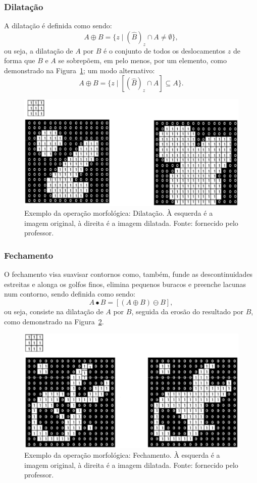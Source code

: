 \documentclass[conference]{Trabalho_2}
\begin{document}
\subsubsection{Dilata\c{c}\~ao}
A dilata\c{c}\~ao \'e definida como sendo:
$$ A \oplus B  = \{z \mid (\hat{B})_z \cap A \neq \emptyset \},$$
ou seja, a dilata\c{c}\~ao de $A$ por $B$ \'e o conjunto de todos os deslocamentos $z$ de forma que $B$ e $A$ se sobrep\~oem, em pelo menos, por um elemento, como demonstrado na Figura~\ref{fig:dilata}; um modo alternativo:
$$ A \oplus B  = \{z \mid [(\hat{B})_z \cap A] \subseteq A \}.$$

\begin{figure}[]
  \centering
  \includegraphics[width = 7.5 cm]{Dilatacao}
  \caption{Exemplo da opera\c{c}\~ao morfol\'ogica: Dilata\c{c}\~ao. \`A esquerda \'e a imagem original, \`a direita \'e a imagem dilatada. Fonte: fornecido pelo professor.}
  \label{fig:dilata}
\end{figure}

\subsubsection{Fechamento}
O fechamento visa suavisar contornos como, tamb\'em, funde as descontinuidades estreitas e alonga os golfos finos, elimina pequenos buracos e preenche lacunas num contorno, sendo definida como sendo:
$$ A \bullet B = [(A \oplus B) \ominus B],$$
ou seja, consiste na dilata\c{c}\~ao de $A$ por $B$, seguida da eros\~ao do resultado por $B$, como demonstrado na Figura~\ref{fig:fecha}.

\begin{figure}[]
  \centering
  \includegraphics[width = 7.5 cm]{Fechamento}
  \caption{Exemplo da opera\c{c}\~ao morfol\'ogica: Fechamento. \`A esquerda \'e a imagem original, \`a direita \'e a imagem dilatada. Fonte: fornecido pelo professor.}
  \label{fig:fecha}
\end{figure}
\end{document}
